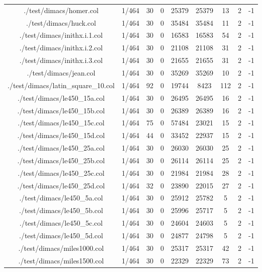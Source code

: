 \begin{table}[htb]
\begin{tabular}{@{}ccccccccc@{}}
        ./test/dimacs/homer.col & 1/464 & 30 & 0 & 25379 & 25379 & 13 & 2 & -1 \\
        ./test/dimacs/huck.col & 1/464 & 30 & 0 & 35484 & 35484 & 11 & 2 & -1 \\
        ./test/dimacs/inithx.i.1.col & 1/464 & 30 & 0 & 16583 & 16583 & 54 & 2 & -1 \\
        ./test/dimacs/inithx.i.2.col & 1/464 & 30 & 0 & 21108 & 21108 & 31 & 2 & -1 \\
        ./test/dimacs/inithx.i.3.col & 1/464 & 30 & 0 & 21655 & 21655 & 31 & 2 & -1 \\
        ./test/dimacs/jean.col & 1/464 & 30 & 0 & 35269 & 35269 & 10 & 2 & -1 \\
        ./test/dimacs/latin\_square\_10.col & 1/464 & 92 & 0 & 19744 & 8423 & 112 & 2 & -1 \\
        ./test/dimacs/le450\_15a.col & 1/464 & 30 & 0 & 26495 & 26495 & 16 & 2 & -1 \\
        ./test/dimacs/le450\_15b.col & 1/464 & 30 & 0 & 26389 & 26389 & 16 & 2 & -1 \\
        ./test/dimacs/le450\_15c.col & 1/464 & 75 & 0 & 57484 & 23021 & 15 & 2 & -1 \\
        ./test/dimacs/le450\_15d.col & 1/464 & 44 & 0 & 33452 & 22937 & 15 & 2 & -1 \\
        ./test/dimacs/le450\_25a.col & 1/464 & 30 & 0 & 26030 & 26030 & 25 & 2 & -1 \\
        ./test/dimacs/le450\_25b.col & 1/464 & 30 & 0 & 26114 & 26114 & 25 & 2 & -1 \\
        ./test/dimacs/le450\_25c.col & 1/464 & 30 & 0 & 21984 & 21984 & 28 & 2 & -1 \\
        ./test/dimacs/le450\_25d.col & 1/464 & 32 & 0 & 23890 & 22015 & 27 & 2 & -1 \\
        ./test/dimacs/le450\_5a.col & 1/464 & 30 & 0 & 25912 & 25782 & 5 & 2 & -1 \\
        ./test/dimacs/le450\_5b.col & 1/464 & 30 & 0 & 25996 & 25717 & 5 & 2 & -1 \\
        ./test/dimacs/le450\_5c.col & 1/464 & 30 & 0 & 24604 & 24603 & 5 & 2 & -1 \\
        ./test/dimacs/le450\_5d.col & 1/464 & 30 & 0 & 24877 & 24798 & 5 & 2 & -1 \\
        ./test/dimacs/miles1000.col & 1/464 & 30 & 0 & 25317 & 25317 & 42 & 2 & -1 \\
        ./test/dimacs/miles1500.col & 1/464 & 30 & 0 & 22329 & 22329 & 73 & 2 & -1 \\

\end{tabular}
\end{table}
